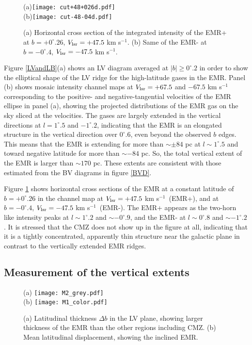 \documentclass[useAMS,usenatbib]{mn2e}
\def\kms{km s$^{-1}$}
\def\vlsr{V_{\rm lsr}}
\def\deg{^\circ}\def\Deg{^\circ}
\begin{document}
\begin{figure} 
\begin{center}   
(a)\texttt{[image: cut+48+026d.pdf]} \\
(b)\texttt{[image: cut-48-04d.pdf]}  
\end{center}
\caption{ 
(a) Horizontal cross section of the integrated intensity of the EMR+ at $b=+0\deg.26$, $\vlsr=+47.5$ \kms. 
(b) Same of the EMR- at $b=-0\deg.4$, $\vlsr=-47.5$ \kms. 
  }
 \label{Horizoncut}  
\end{figure} 

Figure \ref{LVandLB}(a) shows an LV diagram averaged at $|b|\ge 0\deg.2$ in order to show the elliptical shape of the LV ridge for the high-latitude gases in the EMR. Panel (b) shows mosaic intensity channel maps at $\vlsr=+67.5$ and $-67.5$ \kms corresponding to the positive- and negative-tangential velocities of the EMR ellipse in panel (a), showing the projected distributions of the EMR gas on the sky sliced at the velocities. The gases are largely extended in the vertical directions at $l=1\deg.5$ and $-1\deg.2$, indicating that the EMR is an elongated structure in the vertical direction over $0\deg.6$, even beyond the observed $b$ edges. This means that the EMR is extending for more than $\sim \pm 84$ pc at $l\sim 1\deg.5$ and toward negative latitude for more than $\sim -84$ pc. So, the total vertical extent of the EMR is larger than $\sim 170$ pc. These extents are consistent with those estimated from the BV diagrams in figure \ref{BVD}.


Figure \ref{Horizoncut} shows horizontal cross sections of the EMR at a constant latitude of $b=+0\deg.26$ in the channel map at $\vlsr=+47.5$ \kms\ (EMR+), and at $b=-0\deg.4$, $\vlsr=-47.5$ \kms\ (EMR-). The EMR+ appears as the two-horn like intensity peaks at $l\sim 1\deg.2$ and $\sim -0\deg.9$, and the EMR- at $l\sim 0\deg.8$ and $\sim -1\deg.2$. It is stressed that the CMZ does not show up in the figure at all, indicating that it is a tightly concentrated, apparently thin structure near the galactic plane in contrast to the vertically extended EMR ridges.

\subsection{Measurement of the vertical extents}

\begin{figure} 
\begin{center}  
(a) \texttt{[image: M2\_grey.pdf]} \\
(b) \texttt{[image: M1\_color.pdf]}  \\ 
\end{center}
\caption{ 
(a) Latitudinal thickness $\Delta b$ in the LV plane, showing larger thickness of the EMR than the other regions including CMZ. 
(b) Mean latitudinal displacement, showing the inclined EMR. }
 \label{M12}  
\end{figure} 
\end{document}
